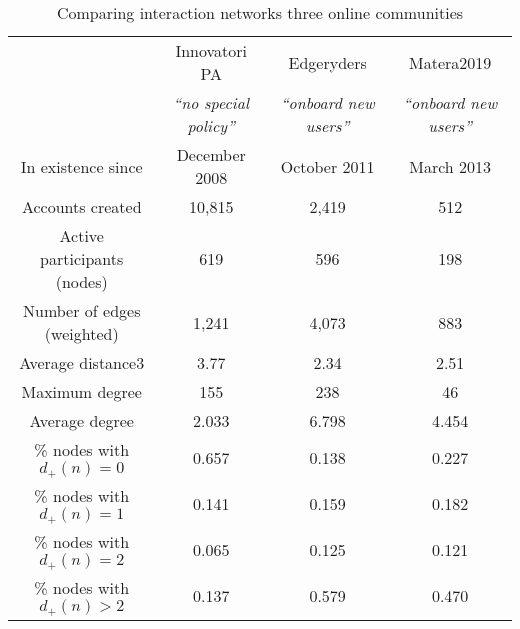 \begin{table}
\centering 
\begin{tabular}{| c | c | c | c |} 
\hline 
& Innovatori PA & Edgeryders & Matera2019\\ 
& \emph{``no special \n policy''} & \emph{``onboard \n new users''} & \emph{``onboard \n new users''}\\ 
\hline 
In existence since & December 2008 & October 2011 & March 2013 \\
Accounts created & 10,815 & 2,419 & 512 \\
\hline 
Active participants (nodes) & 619 & 596 & 198 \\
Number of edges (weighted) & 1,241 & 4,073 & 883 \\
\hline 
Average distance3 & 3.77 & 2.34 & 2.51 \\
Maximum degree & 155 & 238 & 46 \\
Average degree & 2.033 & 6.798 & 4.454 \\
\hline 
\% nodes with $d_+(n) = 0$ & 0.657 & 0.138 & 0.227 \\
\% nodes with $d_+(n) = 1$ & 0.141 & 0.159 & 0.182 \\
\% nodes with $d_+(n) = 2$ & 0.065 & 0.125 & 0.121 \\
\% nodes with $d_+(n) > 2$ & 0.137 & 0.579 & 0.470 \\
\hline 
\end{tabular}
\caption{Comparing interaction networks three online communities}
\label{tab:template}
\end{table}



